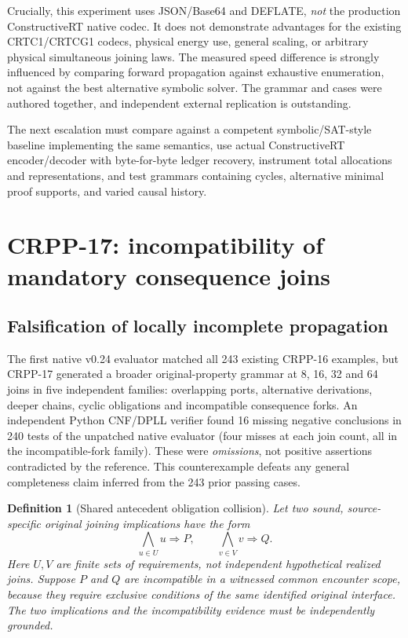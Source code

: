 \documentclass[11pt]{article}
\newtheorem{definition}{Definition}[section]
\begin{document}
Crucially, this experiment uses JSON/Base64 and
DEFLATE, \emph{not} the production ConstructiveRT
native codec. It does not demonstrate advantages
for the existing CRTC1/CRTCG1 codecs, physical
energy use, general scaling, or arbitrary physical
simultaneous joining laws. The measured speed
difference is strongly influenced by comparing
forward propagation against exhaustive enumeration,
not against the best alternative symbolic solver.
The grammar and cases were authored together,
and independent external replication is outstanding.

The next escalation must compare against a
competent symbolic/SAT-style baseline implementing
the same semantics, use actual ConstructiveRT
encoder/decoder with byte-for-byte ledger recovery,
instrument total allocations and representations,
and test grammars containing cycles, alternative
minimal proof supports, and varied causal history.


\section{CRPP-17: incompatibility of mandatory consequence joins}
\label{sec:crpp17}

\subsection{Falsification of locally incomplete propagation}
The first native v0.24 evaluator matched all 243 existing CRPP-16
examples, but CRPP-17 generated a broader original-property grammar
at 8, 16, 32 and 64 joins in five independent families:
overlapping ports, alternative derivations, deeper chains,
cyclic obligations and incompatible consequence forks.
An independent Python CNF/DPLL verifier found 16 missing
negative conclusions in 240 tests of the unpatched native
evaluator (four misses at each join count, all in the
incompatible-fork family). These were \emph{omissions},
not positive assertions contradicted by the reference.
This counterexample defeats any general completeness
claim inferred from the 243 prior passing cases.

\begin{definition}[Shared antecedent obligation collision]
Let two sound, source-specific original joining implications
have the form
\[
 \bigwedge_{u\in U}u \Longrightarrow P,
 \qquad
 \bigwedge_{v\in V}v \Longrightarrow Q.
\]
Here $U,V$ are finite sets of requirements, not independent
hypothetical realized joins. Suppose $P$ and $Q$ are
incompatible in a witnessed common encounter scope,
because they require exclusive conditions of the same
identified original interface. The two implications and
the incompatibility evidence must be independently grounded.
\end{definition}
\end{document}
